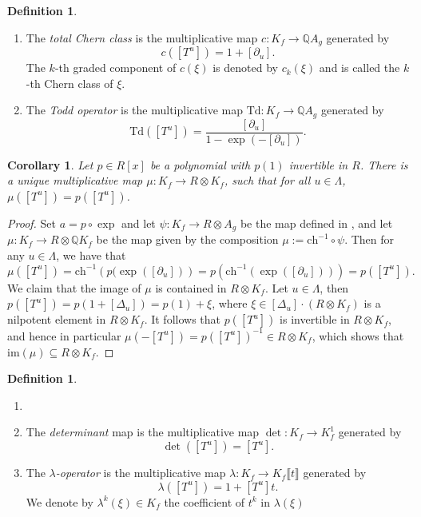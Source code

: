 \documentclass[oneside]{amsart}
\theoremstyle{plain}
\newtheorem{corollary}[theorem]{Corollary}
\theoremstyle{definition}
\newtheorem{definition}[theorem]{Definition}
\newcommand{\Q}{{\mathbb{Q}}}
\newcommand{\im}{{\mathrm{im}}}
\newcommand{\ch}{{\mathrm{ch}}}
\newcommand{\Td}{{\mathrm{Td}}}
\begin{document}
\begin{definition}\label{def:chern-class-todd}
\begin{enumerate}
    \item
    The \emph{total Chern class} is the multiplicative map $c: K_f \to \Q A_g$ generated by
    \[
        c([T^u]) = 1 + [\partial_u].
    \]
    The $k$-th graded component of $c(\xi)$ is denoted by $c_k(\xi)$ and is called the $k$-th Chern class of $\xi$.
    \item
    The \emph{Todd operator} is the multiplicative map $\Td: K_f \to \Q A_g$ generated by
    \[
        \Td([T^u]) = \frac{[\partial_u]}{1 - \exp(-[\partial_u])}.
    \]
\end{enumerate} 
\end{definition}

\begin{corollary}
    Let $p \in R[x]$ be a polynomial with $p(1)$ invertible in $R$.
    There is a unique multiplicative map
    $\mu: K_f \to R \otimes K_f$, such that for all $u \in \Lambda$,
    $\mu([T^u]) = p([T^u])$.
\end{corollary}

\begin{proof} 
    Set $a = p \circ \exp$ and let $\psi: K_f \to R \otimes A_g$ be the map defined in , and let $\mu: K_f \to R \otimes \Q K_f$ be the map given by the composition $\mu := \ch^{-1} \circ \psi$.
    Then for any $u \in \Lambda$, we have that 
    \[\mu([T^u]) = \ch^{-1}\left(p(\exp([\partial_u])\right)
    = p(\ch^{-1}(\exp([\partial_u]))) = p([T^u]).\]
    We claim that the image of $\mu$ is contained in $R \otimes K_f$.
    Let $u \in \Lambda$,
    then $p([T^u]) = p(1 + [\Delta_u]) = p(1) + \xi$, where $\xi \in [\Delta_u]\cdot (R\otimes K_f)$ is a nilpotent element in $R \otimes K_f$. It follows that $p([T^u])$ is invertible in $R\otimes K_f$, and hence in particular
    $\mu(-[T^u]) = p([T^u])^{-1} \in R \otimes K_f$, which shows that $\im(\mu) \subseteq R \otimes K_f$.
\end{proof}

\begin{definition}\label{def:det-lambda}
\begin{enumerate}
    \item []
    \item 
    The \emph{determinant} map is the multiplicative map $\det: K_f \to K^1_f$
    generated by
    \[\det([T^u]) = [T^u].\]

    \item
    The \emph{$\lambda$-operator} is the multiplicative map
    $\lambda: K_f \to K_f\llbracket t \rrbracket$ generated by
    \[\lambda([T^u]) = 1 + [T^u] t.\]
    We denote by $\lambda^k(\xi) \in K_f$ the coefficient of $t^k$ in $\lambda(\xi)$
\end{enumerate} 
\end{definition}
\end{document}
